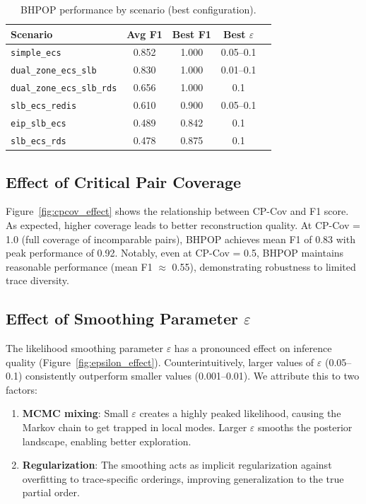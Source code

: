 \begin{table}[t]
\caption{\textsc{BHPOP} performance by scenario (best configuration).}
\label{tab:per_scenario}
\centering
\small
\begin{tabular}{lcccc}
\toprule
\textbf{Scenario} & \textbf{Avg F1} & \textbf{Best F1} & \textbf{Best $\varepsilon$} \\
\midrule
\texttt{simple\_ecs} & 0.852 & 1.000 & 0.05--0.1 \\
\texttt{dual\_zone\_ecs\_slb} & 0.830 & 1.000 & 0.01--0.1 \\
\texttt{dual\_zone\_ecs\_slb\_rds} & 0.656 & 1.000 & 0.1 \\
\texttt{slb\_ecs\_redis} & 0.610 & 0.900 & 0.05--0.1 \\
\texttt{eip\_slb\_ecs} & 0.489 & 0.842 & 0.1 \\
\texttt{slb\_ecs\_rds} & 0.478 & 0.875 & 0.1 \\
\bottomrule
\end{tabular}
\end{table}

\subsection{Effect of Critical Pair Coverage}

Figure~\ref{fig:cpcov_effect} shows the relationship between CP-Cov and F1 score. As expected, higher coverage leads to better reconstruction quality. At CP-Cov = 1.0 (full coverage of incomparable pairs), \textsc{BHPOP} achieves mean F1 of 0.83 with peak performance of 0.92. Notably, even at CP-Cov = 0.5, \textsc{BHPOP} maintains reasonable performance (mean F1 $\approx$ 0.55), demonstrating robustness to limited trace diversity.

\subsection{Effect of Smoothing Parameter $\varepsilon$}

The likelihood smoothing parameter $\varepsilon$ has a pronounced effect on inference quality (Figure~\ref{fig:epsilon_effect}). Counterintuitively, larger values of $\varepsilon$ (0.05--0.1) consistently outperform smaller values (0.001--0.01). We attribute this to two factors:

\begin{enumerate}[leftmargin=*,nosep]
    \item \textbf{MCMC mixing}: Small $\varepsilon$ creates a highly peaked likelihood, causing the Markov chain to get trapped in local modes. Larger $\varepsilon$ smooths the posterior landscape, enabling better exploration.
    \item \textbf{Regularization}: The smoothing acts as implicit regularization against overfitting to trace-specific orderings, improving generalization to the true partial order.
\end{enumerate}

